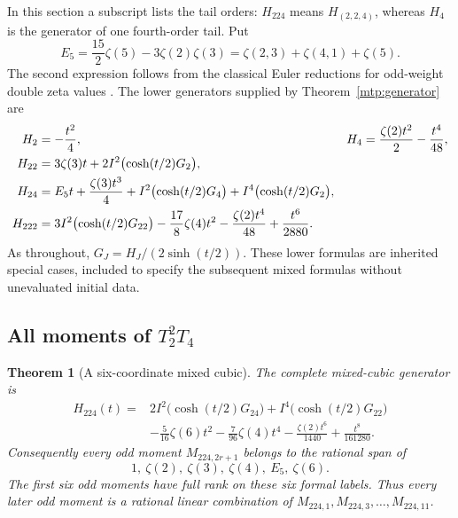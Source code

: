 \documentclass[11pt,letterpaper]{article}
\numberwithin{equation}{section}
\newtheorem{theorem}{Theorem}[section]
\theoremstyle{definition}
\theoremstyle{remark}
\begin{document}
In this section a subscript lists the tail orders: $H_{224}$ means
$H_{(2,2,4)}$, whereas $H_4$ is the generator of one fourth-order tail.
Put
\begin{equation}\label{mtp:E5}
 E_5=\frac{15}{2}\zeta(5)-3\zeta(2)\zeta(3)
     =\zeta(2,3)+\zeta(4,1)+\zeta(5).
\end{equation}
The second expression follows from the classical Euler reductions for
odd-weight double zeta values \cite[Equations (4), (9)]{Hoffman}.
The lower generators supplied by Theorem~\ref{mtp:generator} are
\begin{align}
 H_2&=-\frac{t^2}{4},
 &H_4&=\frac{\zeta(2)t^2}{2}-\frac{t^4}{48},\label{mtp:single-generators}\\
 H_{22}&=3\zeta(3)t+2I^2\bigl(\cosh(t/2)G_2\bigr),\notag\\
 H_{24}&=E_5t+\frac{\zeta(3)t^3}{4}
       +I^2\bigl(\cosh(t/2)G_4\bigr)
       +I^4\bigl(\cosh(t/2)G_2\bigr),\label{mtp:lower-generators}\\
 H_{222}&=3I^2\bigl(\cosh(t/2)G_{22}\bigr)
      -\frac{17}{8}\zeta(4)t^2-\frac{\zeta(2)t^4}{48}
      +\frac{t^6}{2880}.\notag
\end{align}
As throughout, $G_J=H_J/(2\sinh(t/2))$. These lower formulas are
inherited special cases, included to specify the subsequent mixed
formulas without unevaluated initial data.

\subsection{All moments of \texorpdfstring{$T_2^2T_4$}{T2 squared times T4}}

\begin{theorem}[A six-coordinate mixed cubic]
\label{mtp:triple}
The complete mixed-cubic generator is
\begin{equation}\label{mtp:H224}
 \boxed{\begin{aligned}
 H_{224}(t)={}&2I^2\bigl(\cosh(t/2)G_{24}\bigr)
                 +I^4\bigl(\cosh(t/2)G_{22}\bigr)\\
       &-\frac5{16}\zeta(6)t^2-\frac7{96}\zeta(4)t^4
                    -\frac{\zeta(2)t^6}{1440}+\frac{t^8}{161280}.
 \end{aligned}}
\end{equation}
Consequently every odd moment $M_{224,2r+1}$ belongs to the rational
span of
\begin{equation}\label{mtp:triple-coordinates}
                         1,\ \zeta(2),\ \zeta(3),\ \zeta(4),\ E_5,\ \zeta(6).
\end{equation}
The first six odd moments have full rank on these six formal labels.
Thus every later odd moment is a rational linear combination of
$M_{224,1},M_{224,3},\ldots,M_{224,11}$.
\end{theorem}
\end{document}
